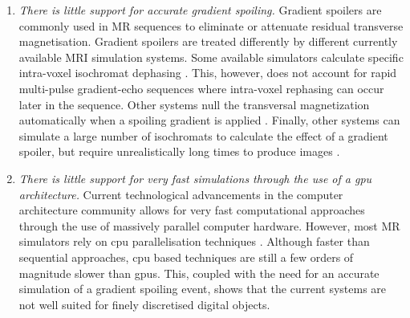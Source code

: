 \begin{enumerate}

    \item \textit{There is little support for accurate gradient spoiling.}
    Gradient spoilers are commonly used in MR sequences to eliminate or attenuate residual transverse magnetisation.
    Gradient spoilers are treated differently by different currently available MRI simulation systems.
    Some available simulators calculate specific intra-voxel isochromat dephasing \cite{Drobnjak2006} \cite{Jochimsen2006}.
    This, however, does not account for rapid multi-pulse gradient-echo sequences where intra-voxel rephasing can occur later in the sequence.
    Other systems null the transversal magnetization automatically when a spoiling gradient is applied \cite{Benoit-Cattin2005} \cite{Liu2017}.
    Finally, other systems can simulate a large number of isochromats to calculate the effect of a gradient spoiler, but require unrealistically long times to produce images \cite{Stocker2010}.
    
    
    
    \item \textit{There is little support for very fast simulations through the use of a \ac{gpu} architecture.}
    Current technological advancements in the computer architecture community allows for very fast computational approaches through the use of massively parallel computer hardware.
    However, most MR simulators rely on \ac{cpu} parallelisation techniques 
    \cite{Benoit-Cattin2005}
    \cite{Drobnjak2006} \cite{Stocker2010}.
    Although faster than sequential approaches, \ac{cpu} based techniques are still a few orders of magnitude slower than \ac{gpu}s.
    This, coupled with the need for an accurate simulation of a gradient spoiling event, shows that the current systems are not well suited for finely discretised digital objects. \\


\end{enumerate}
